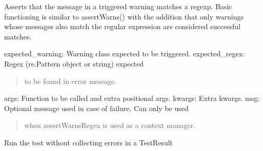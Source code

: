 \documentclass[letterpaper,10pt,english]{sphinxmanual}
\begin{document}
\begin{fulllineitems}

\begin{fulllineitems}
\label{\detokenize{_autosummary/tests.test_unit.test_df:tests.test_unit.test_df.assertWarnsRegex}}
\pysigstartsignatures
{}
\pysigstopsignatures
\sphinxAtStartPar
Asserts that the message in a triggered warning matches a regexp.
Basic functioning is similar to assertWarns() with the addition
that only warnings whose messages also match the regular expression
are considered successful matches.
\begin{description}
\sphinxAtStartPar
expected\_warning: Warning class expected to be triggered.
expected\_regex: Regex (re.Pattern object or string) expected
\begin{quote}

\sphinxAtStartPar
to be found in error message.
\end{quote}

\sphinxAtStartPar
args: Function to be called and extra positional args.
kwargs: Extra kwargs.
msg: Optional message used in case of failure. Can only be used
\begin{quote}

\sphinxAtStartPar
when assertWarnsRegex is used as a context manager.
\end{quote}

\end{description}

\end{fulllineitems}


\begin{fulllineitems}
\label{\detokenize{_autosummary/tests.test_unit.test_df:tests.test_unit.test_df.debug}}
\pysigstartsignatures
{}
\pysigstopsignatures
\sphinxAtStartPar
Run the test without collecting errors in a TestResult

\end{fulllineitems}



\end{fulllineitems}
\end{document}
